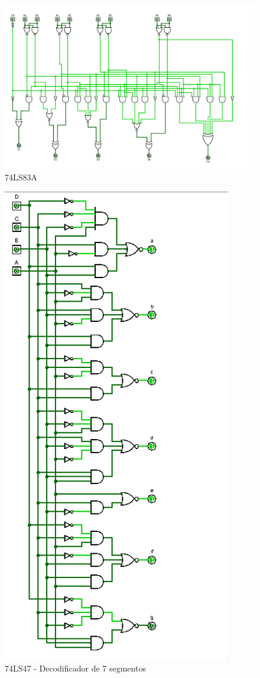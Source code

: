 \documentclass[a4paper,11pt]{article}
\begin{document}
\begin{enumerate}
        \newpage
        \begin{figure}[ht]
            \caption{74LS83A}
            \centering
            \includegraphics[width=16cm]{74LS83A}
        \end{figure}
        \newpage
        \begin{figure}[ht]
            \caption{74LS47 - Decodificador de 7 segmentos}
            \centering
            \includegraphics[width=10cm]{74LS47}
        \end{figure}
    
\end{enumerate}
\end{document}
